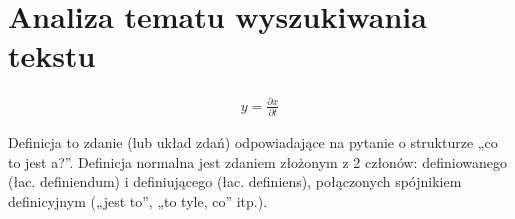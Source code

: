 \chapter{Analiza tematu wyszukiwania tekstu}  %
% 


%
\begin{align}
    y = \frac{\partial x}{\partial t}
\end{align}
%
%

\begin{Definition}\label{def:1}
Definicja to zdanie (lub układ zdań) odpowiadające na pytanie o strukturze „co to jest a?”. Definicja normalna jest zdaniem złożonym z 2 członów: definiowanego (łac. definiendum) i definiującego (łac. definiens), połączonych spójnikiem definicyjnym („jest to”, „to tyle, co” itp.). 
\end{Definition}

